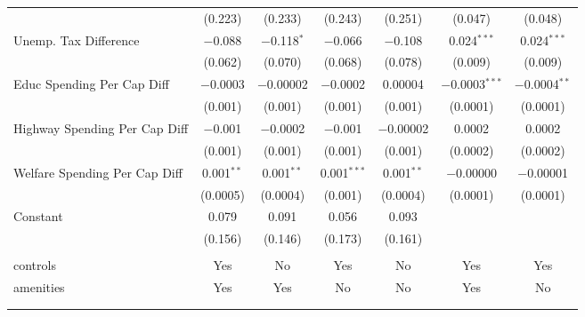 \begin{table}[!htbp]
\begin{tabular}{@{\extracolsep{5pt}}lcccccc}
  & (0.223) & (0.233) & (0.243) & (0.251) & (0.047) & (0.048) \\ 
  Unemp. Tax Difference & $-$0.088 & $-$0.118$^{*}$ & $-$0.066 & $-$0.108 & 0.024$^{***}$ & 0.024$^{***}$ \\ 
  & (0.062) & (0.070) & (0.068) & (0.078) & (0.009) & (0.009) \\ 
  Educ Spending Per Cap Diff & $-$0.0003 & $-$0.00002 & $-$0.0002 & 0.00004 & $-$0.0003$^{***}$ & $-$0.0004$^{**}$ \\ 
  & (0.001) & (0.001) & (0.001) & (0.001) & (0.0001) & (0.0001) \\ 
  Highway Spending Per Cap Diff & $-$0.001 & $-$0.0002 & $-$0.001 & $-$0.00002 & 0.0002 & 0.0002 \\ 
  & (0.001) & (0.001) & (0.001) & (0.001) & (0.0002) & (0.0002) \\ 
  Welfare Spending Per Cap Diff & 0.001$^{**}$ & 0.001$^{**}$ & 0.001$^{***}$ & 0.001$^{**}$ & $-$0.00000 & $-$0.00001 \\ 
  & (0.0005) & (0.0004) & (0.001) & (0.0004) & (0.0001) & (0.0001) \\ 
  Constant & 0.079 & 0.091 & 0.056 & 0.093 &  &  \\ 
  & (0.156) & (0.146) & (0.173) & (0.161) &  &  \\ 
 \hline \\[-1.8ex] 
controls & Yes & No & Yes & No & Yes & Yes \\ 
amenities & Yes & Yes & No & No & Yes & No \\ 
\hline \\[-1.8ex] 
\hline 
\hline \\[-1.8ex] 
\end{tabular} 
\end{table} 

